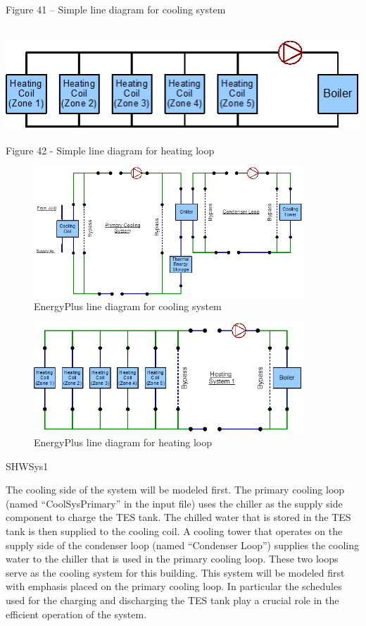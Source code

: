 Figure 41 -- Simple line diagram for cooling system

~~~~~ \includegraphics{media/image042.png}

Figure 42 - Simple line diagram for heating loop

\begin{figure}[hbtp] %
\centering
\includegraphics[width=0.9\textwidth, height=0.9\textheight, keepaspectratio=true]{media/image043.png}
\caption{EnergyPlus line diagram for cooling system \protect \label{fig:energyplus-line-diagram-for-cooling-system}}
\end{figure}

\begin{figure}[hbtp] %
\centering
\includegraphics[width=0.9\textwidth, height=0.9\textheight, keepaspectratio=true]{media/image044.png}
\caption{EnergyPlus line diagram for heating loop \protect \label{fig:energyplus-line-diagram-for-heating-loop}}
\end{figure}

SHWSys1

The cooling side of the system will be modeled first. The primary cooling loop (named ``CoolSysPrimary'' in the input file) uses the chiller as the supply side component to charge the TES tank. The chilled water that is stored in the TES tank is then supplied to the cooling coil. A cooling tower that operates on the supply side of the condenser loop (named ``Condenser Loop'') supplies the cooling water to the chiller that is used in the primary cooling loop. These two loops serve as the cooling system for this building. This system will be modeled first with emphasis placed on the primary cooling loop. In particular the schedules used for the charging and discharging the TES tank play a crucial role in the efficient operation of the system.

